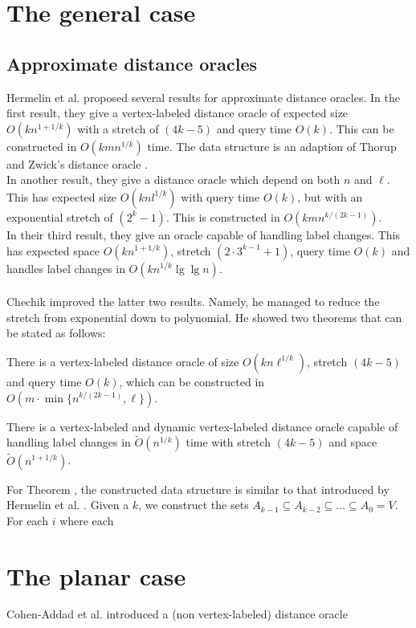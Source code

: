 \section{The general case}

\subsection{Approximate distance oracles}
Hermelin et al. \cite{hermelin2011distance} proposed several results for approximate
distance oracles. In the first result, they give a vertex-labeled distance oracle of
expected size $O(kn^{1+1/k})$ with a stretch of $(4k-5)$ and query time $O(k)$. This can
be constructed in $O(kmn^{1/k})$ time. The data structure is an adaption of Thorup and
Zwick's distance oracle \cite{thorup2005approximate}. \\
In another result, they give a distance oracle which depend on both $n$ and $\ell$. This has
expected size $O(knl^{1/k})$ with query time $O(k)$, but with an exponential stretch of
$(2^k-1)$. This is constructed in $O(kmn^{k/(2k-1)})$. \\
In their third result, they give an oracle capable of handling label changes. This has
expected space $O(kn^{1+1/k})$, stretch $(2\cdot3^{k-1}+1)$, query time $O(k)$ and
handles label changes in $O(kn^{1/k}\lg \lg n)$. \\
\\
Chechik \cite{chechik2012improved} improved the latter two results. Namely, he managed to
reduce the stretch from exponential down to polynomial. He showed two theorems that can
be stated as follows:
\begin{thm}\label{chech1}
  There is a vertex-labeled distance oracle
of size $O(kn\ell^{1/k})$, stretch $(4k-5)$  and query time $O(k)$, which can be
constructed in $O(m\cdot \min\{n^{k/(2k-1)}, \ell\})$.
\end{thm}
\begin{thm}
  There is a vertex-labeled and dynamic vertex-labeled distance oracle capable of handling label changes in
$\tilde{O}(n^{1/k})$ time with stretch $(4k-5)$ and space $\tilde{O}(n^{1+1/k})$.
\end{thm}
For Theorem \cite{chech1}, the constructed data structure is similar to that introduced
by Hermelin et al. \cite{hermelin2011distance}. Given a $k$, we construct the sets
$A_{k-1} \subseteq A_{k-2} \subseteq \dots \subseteq A_0=V$. For each $i$ where each 

\section{The planar case}
Cohen-Addad et al. \cite{cohen2017fast} introduced a (non vertex-labeled) distance
oracle  
